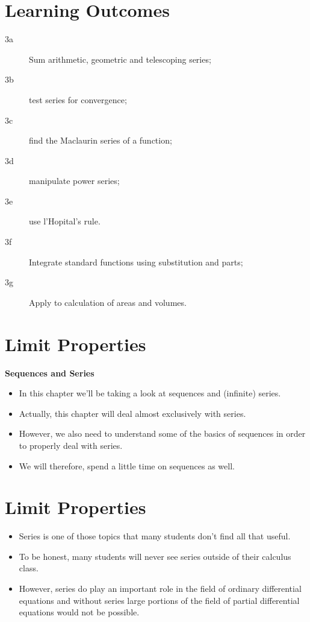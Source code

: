 \documentclass{beamer}
\begin{document}
	
	\section{Learning Outcomes}
	\begin{description}
		\item[3a] Sum arithmetic, geometric and telescoping series; 
		\item[3b] test series for convergence; 
		\item[3c] find the Maclaurin series of a function; 
		\item[3d] manipulate power series; 
		\item[3e] use l'Hopital's rule. 
		\item[3f] Integrate standard functions using substitution and parts; 
		\item[3g] Apply to calculation of areas and volumes. 
	\end{description}
	
	
	
	\section{Limit Properties}
	
	\textbf{Sequences and Series}\\
	\begin{itemize}
		\item In this chapter we’ll be taking a look at sequences and (infinite) series. 
		\item Actually, this chapter will deal almost exclusively with series. 
		\item However, we also need to understand some of the basics of sequences in order to properly deal with series.  
		\item We will therefore, spend a little time on sequences as well.
	\end{itemize}
	
	
	\section{Limit Properties}
	
	\begin{itemize}
		\item  Series is one of those topics that many students don’t find all that useful. \item To be honest, many students will never see series outside of their calculus class. \item However, series do play an important role in the field of ordinary differential equations and without series large portions of the field of partial differential equations would not be possible.
	\end{itemize}
	
\end{document}
